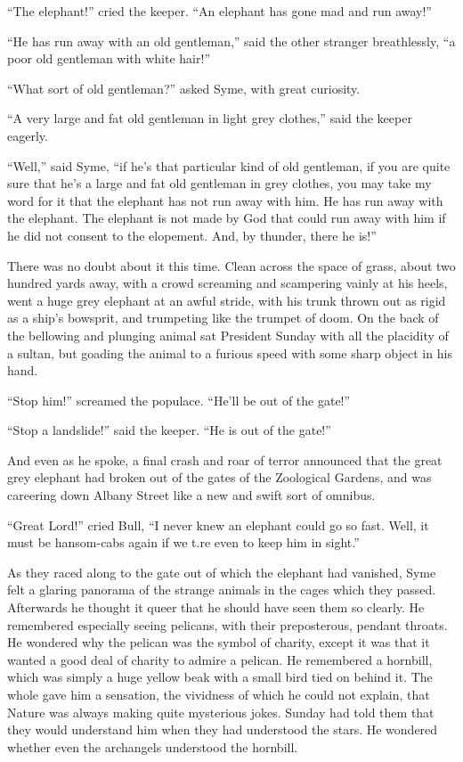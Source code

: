 \documentclass{book}
\begin{document}
“The elephant!” cried the keeper. “An elephant has gone mad and run away!”

“He has run away with an old gentleman,” said the other stranger breathlessly, “a poor old gentleman with white hair!”

“What sort of old gentleman?” asked Syme, with great curiosity.

“A very large and fat old gentleman in light grey clothes,” said the keeper eagerly.

“Well,” said Syme, “if he’s that particular kind of old gentleman, if you are quite sure that he’s a large and fat old gentleman in grey clothes, you may take my word for it that the elephant has not run away with him. He has run away with the elephant. The elephant is not made by God that could run away with him if he did not consent to the elopement. And, by thunder, there he is!”

There was no doubt about it this time. Clean across the space of grass, about two hundred yards away, with a crowd screaming and scampering vainly at his heels, went a huge grey elephant at an awful stride, with his trunk thrown out as rigid as a ship’s bowsprit, and trumpeting like the trumpet of doom. On the back of the bellowing and plunging animal sat President Sunday with all the placidity of a sultan, but goading the animal to a furious speed with some sharp object in his hand.

“Stop him!” screamed the populace. “He’ll be out of the gate!”

“Stop a landslide!” said the keeper. “He is out of the gate!”

And even as he spoke, a final crash and roar of terror announced that the great grey elephant had broken out of the gates of the Zoological Gardens, and was careering down Albany Street like a new and swift sort of omnibus.

“Great Lord!” cried Bull, “I never knew an elephant could go so fast. Well, it must be hansom-cabs again if we t.re even to keep him in sight.”

As they raced along to the gate out of which the elephant had vanished, Syme felt a glaring panorama of the strange animals in the cages which they passed. Afterwards he thought it queer that he should have seen them so clearly. He remembered especially seeing pelicans, with their preposterous, pendant throats. He wondered why the pelican was the symbol of charity, except it was that it wanted a good deal of charity to admire a pelican. He remembered a hornbill, which was simply a huge yellow beak with a small bird tied on behind it. The whole gave him a sensation, the vividness of which he could not explain, that Nature was always making quite mysterious jokes. Sunday had told them that they would understand him when they had understood the stars. He wondered whether even the archangels understood the hornbill.
\end{document}
